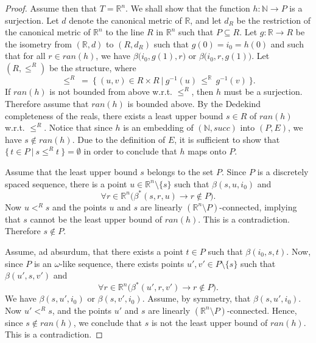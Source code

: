 \documentclass{LMCS}
\theoremstyle{plain}
\newcommand{\rsq}{\mathbb{R}^n}
\newcommand{\mi}{\mathit}
\begin{document}
\begin{proof}

%
Assume then that $T=\rsq$. We shall show that the function $h:\mathbb{N}\longrightarrow P$ is a surjection.
%
Let $d$ denote the canonical metric of $\mathbb{R}$, and let $d_R$ be the
%
restriction of the canonical metric of $\rsq$ to the line $R$ in $\rsq$ such that $P\subseteq R$.
%
Let $g:\mathbb{R}\longrightarrow R$ be the isometry from $(\mathbb{R},d)$ to $(R,d_R)$ such
%
that $g(0) = i_0 = h(0)$ and such
%
that for all $r\in\mi{ran}(h)$, we have $\beta\bigl(i_0,g(1),r\bigr)$ or $\beta\bigl(i_0,r,g(1)\bigr)$.
%
Let $(R,\leq^R)$ be the
%
structure, where
%
%
%
$$\leq^{R}\ =\ \{\ (u,v)\in R\times R\ |\ g^{-1}(u)\, \leq^{\mathbb{R}}\, g^{-1}(v)\ \}.$$
%
%
%
If $\mi{ran}(h)$ is not bounded from above w.r.t. $\leq^R$, then $h$
%
must be a surjection. Therefore
%
assume that $\mi{ran}(h)$ is bounded above. By the Dedekind completeness of the reals, there
%
exists a least upper bound $s\in R$ of $\mi{ran}(h)$ w.r.t. $\leq^R$.
%
Notice that since $h$ is an 
%
embedding of $(\mathbb{N},\mi{succ})$ into $(P,E)$, we have $s\not\in\mi{ran}(h)$.
%
Due to the definition of $E$, it is sufficient to show that $\{\, t\in P\ |\ s\leq^R t\ \} = \emptyset$ in order to conclude
%
that $h$ maps onto $P$.
%


%
Assume that the least upper bound $s$ belongs to the set $P$. Since $P$ is a discretely spaced sequence,
%
there is a point $u\in\mathbb{R}^n\setminus\{s\}$ such that $\beta(s,u,i_0)$ and
%
%
%
$$\forall r\in\mathbb{R}^n
%
\bigl(\beta^*(s,r,u)
%
\rightarrow r\not\in P\bigl).$$
%
%
%
Now $u<^R s$ and the points $u$ and $s$ are linearly $(\mathbb{R}^n\setminus P)$-connected,
%
implying that $s$ cannot be the
%
least upper bound of $\mi{ran}(h)$. This is a
%
contradiction. Therefore $s\not\in P$.
%



%
Assume, ad absurdum, that there exists a point $t\in P$
%
such that $\beta(i_0,s,t)$.
%
Now, since $P$ is an $\omega$-like sequence, there
%
exists points $u',v'\in P\setminus\{s\}$
%
such that
%
$\beta(u',s,v')$ and
%
%
%
$$\forall r\in \rsq\bigl(\beta^*(u',r,v')\rightarrow r\not\in P\bigr).$$
%
%
%
We have $\beta(s,u',i_0)$ or $\beta(s,v',i_0)$. Assume, by symmetry, that $\beta(s,u',i_0)$.
%
Now $u'<^R s$, and the points $u'$ and $s$ are
%
linearly $(\rsq\setminus P)$-connected.
%
Hence, since  $s\not\in \mi{ran}(h)$, we conclude that
%
$s$ is not the least upper bound of $\mi{ran}(h)$.
%
This is a contradiction.
%
\end{proof}
%
%
%
\end{document}
